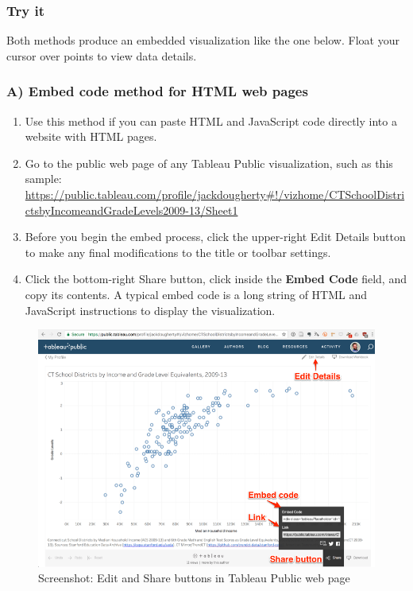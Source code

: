 \documentclass[
  english,
]{book}
\begin{document}
\hypertarget{try-it-5}{%
\subsubsection*{Try it}\label{try-it-5}}

Both methods produce an embedded visualization like the one below. Float your cursor over points to view data details.

\hypertarget{a-embed-code-method-for-html-web-pages}{%
\subsubsection*{A) Embed code method for HTML web pages}\label{a-embed-code-method-for-html-web-pages}}

\begin{enumerate}
\def\labelenumi{\arabic{enumi})}
\item
  Use this method if you can paste HTML and JavaScript code directly into a website with HTML pages.
\item
  Go to the public web page of any Tableau Public visualization, such as this sample: \url{https://public.tableau.com/profile/jackdougherty\#!/vizhome/CTSchoolDistrictsbyIncomeandGradeLevels2009-13/Sheet1}
\item
  Before you begin the embed process, click the upper-right Edit Details button to make any final modifications to the title or toolbar settings.
\item
  Click the bottom-right Share button, click inside the \textbf{Embed Code} field, and copy its contents. A typical embed code is a long string of HTML and JavaScript instructions to display the visualization.
\end{enumerate}

\begin{figure}
\centering
\includegraphics{images/07-embed/tableau-edit-share.png}
\caption{Screenshot: Edit and Share buttons in Tableau Public web page}
\end{figure}
\end{document}
